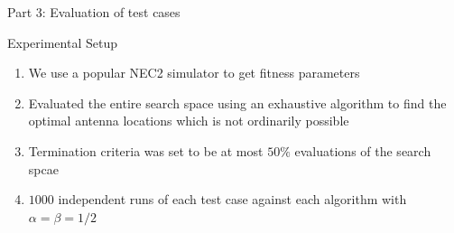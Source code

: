 \documentclass{beamer}
\begin{document}
\begin{frame}{\null}
    \begin{tcolorbox}[colback=green!5]
        \centering\Huge
        Part 3: Evaluation of test cases
    \end{tcolorbox}
\end{frame}

\begin{frame}{Experimental Setup}
\begin{enumerate}\itemsep1.2em
        \item We use a popular NEC2 simulator to get fitness parameters 
        \item Evaluated the entire search space using an exhaustive algorithm to find the optimal antenna locations which is not ordinarily possible
        \item Termination criteria was set to be at most $50\%$ evaluations of the search spcae
        \item $1000$ independent runs of each test case against each algorithm with $\alpha = \beta = 1/2$
    \end{enumerate}
    \vspace*{0.5cm}
    \vspace{10mm}
\end{frame}
\end{document}
